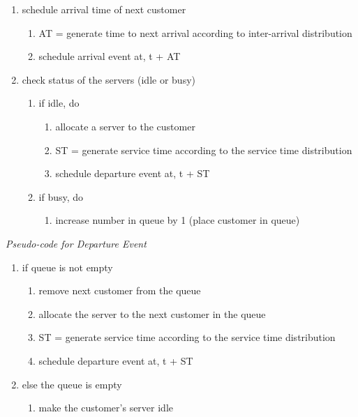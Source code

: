 \documentclass[
]{book}
\providecommand{\tightlist}{%
  \setlength{\itemsep}{0pt}\setlength{\parskip}{0pt}}
\theoremstyle{definition}
\theoremstyle{definition}
\theoremstyle{definition}
\theoremstyle{definition}
\theoremstyle{remark}
\begin{document}
\begin{enumerate}
\def\labelenumi{\arabic{enumi}.}
\item
  schedule arrival time of next customer

  \begin{enumerate}
  \def\labelenumii{\arabic{enumii}.}
  \item
    AT = generate time to next arrival according to inter-arrival
    distribution
  \item
    schedule arrival event at, t + AT
  \end{enumerate}
\item
  check status of the servers (idle or busy)

  \begin{enumerate}
  \def\labelenumii{\arabic{enumii}.}
  \item
    if idle, do

    \begin{enumerate}
    \def\labelenumiii{\arabic{enumiii}.}
    \item
      allocate a server to the customer
    \item
      ST = generate service time according to the service time
      distribution
    \item
      schedule departure event at, t + ST
    \end{enumerate}
  \item
    if busy, do

    \begin{enumerate}
    \def\labelenumiii{\arabic{enumiii}.}
    \tightlist
    \item
      increase number in queue by 1 (place customer in queue)
    \end{enumerate}
  \end{enumerate}
\end{enumerate}

\emph{Pseudo-code for Departure Event}

\begin{enumerate}
\def\labelenumi{\arabic{enumi}.}
\item
  if queue is not empty

  \begin{enumerate}
  \def\labelenumii{\arabic{enumii}.}
  \item
    remove next customer from the queue
  \item
    allocate the server to the next customer in the queue
  \item
    ST = generate service time according to the service time
    distribution
  \item
    schedule departure event at, t + ST
  \end{enumerate}
\item
  else the queue is empty

  \begin{enumerate}
  \def\labelenumii{\arabic{enumii}.}
  \tightlist
  \item
    make the customer's server idle
  \end{enumerate}
\end{enumerate}
\end{document}
